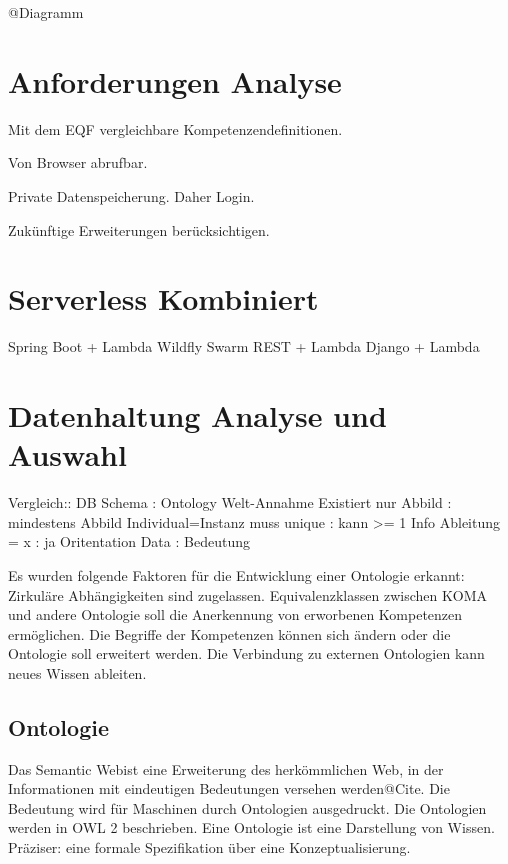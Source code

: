 \documentclass[
12pt,
english,
ngerman,
headsepline,
twoside,
openright,
numbers=noenddot,version=first
]{scrreprt}
\begin{document}
@Diagramm

\section{Anforderungen Analyse}
Mit dem EQF vergleichbare Kompetenzendefinitionen.

Von Browser abrufbar. 

Private Datenspeicherung. Daher Login.

Zukünftige Erweiterungen berücksichtigen.

\section{Serverless Kombiniert}
Spring Boot + Lambda
Wildfly Swarm REST + Lambda
Django + Lambda

\section{Datenhaltung Analyse und Auswahl}


Vergleich:: DB Schema                       : Ontology
Welt-Annahme Existiert nur Abbild           : mindestens Abbild
Individual=Instanz muss unique              : kann >= 1
Info Ableitung = x                          : ja
Oritentation    Data                        : Bedeutung

Es wurden folgende Faktoren für die Entwicklung einer Ontologie erkannt:
Zirkuläre Abhängigkeiten sind zugelassen.  
Equivalenzklassen zwischen KOMA und andere Ontologie soll die Anerkennung von erworbenen Kompetenzen ermöglichen.
Die Begriffe der Kompetenzen können sich ändern oder die Ontologie soll erweitert werden.
Die Verbindung zu externen Ontologien kann neues Wissen ableiten.


\subsection{Ontologie}

Das \glqq Semantic Web\grqq ist eine Erweiterung des herkömmlichen Web, in der Informationen mit eindeutigen Bedeutungen versehen werden@Cite. Die Bedeutung wird für Maschinen durch Ontologien ausgedruckt. Die Ontologien werden in OWL 2 beschrieben. 
Eine Ontologie ist eine Darstellung von Wissen. Präziser: eine formale Spezifikation über eine Konzeptualisierung.
\end{document}
